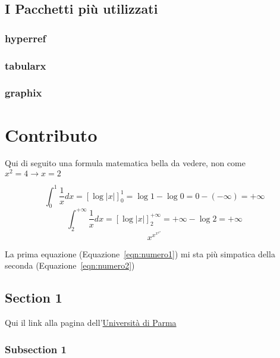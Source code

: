 \documentclass[11pt,b5paper,openany,titlepage,twoside]{book}
\begin{document}
	\section{I Pacchetti più utilizzati}
	\subsection*{hyperref}
	\subsection*{tabularx}
	\subsection*{graphix}
	
	\chapter{\label{ch:contr}Contributo}

	Qui di seguito una formula matematica bella da vedere, non come $x^{2} = 4 \rightarrow x = 2$

	\begin{equation}
		\label{eqn:numero1}
		\int_0^1{
			\frac 1 x dx = \left[\log |x|\right]^1_0 = \log 1 - \log 0 = 0 - (- \infty) = +\infty
			}
	\end{equation}
	\begin{equation}
		\label{eqn:numero2}
		\int_2^{+\infty}{
			\frac 1 x dx = \left[\log |x|\right]^{+\infty}_2 = +\infty - \log 2  = +\infty
		}
	\end{equation}
	\begin{equation*}
		x^{x^{x^{x^x}}}
	\end{equation*}

	La prima equazione (Equazione~\ref{eqn:numero1}) 
	mi sta più simpatica della seconda (Equazione~\ref{eqn:numero2})

	\section{Section 1}
	Qui il link alla pagina dell'\href{https://unipr.it}{Università di Parma}

	\subsection{Subsection 1}
\end{document}
